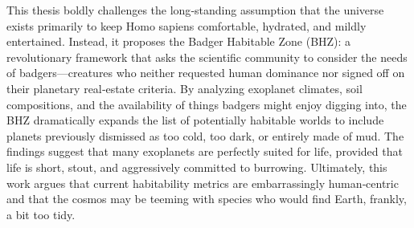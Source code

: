 This thesis boldly challenges the long‑standing assumption that the universe exists primarily to keep Homo sapiens comfortable, hydrated, and mildly entertained. Instead, it proposes the Badger Habitable Zone (BHZ): a revolutionary framework that asks the scientific community to consider the needs of badgers—creatures who neither requested human dominance nor signed off on their planetary real‑estate criteria. By analyzing exoplanet climates, soil compositions, and the availability of things badgers might enjoy digging into, the BHZ dramatically expands the list of potentially habitable worlds to include planets previously dismissed as too cold, too dark, or entirely made of mud. The findings suggest that many exoplanets are perfectly suited for life, provided that life is short, stout, and aggressively committed to burrowing. Ultimately, this work argues that current habitability metrics are embarrassingly human‑centric and that the cosmos may be teeming with species who would find Earth, frankly, a bit too tidy.